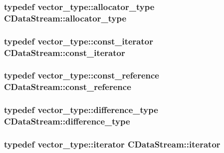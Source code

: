 \subsubsection[{allocator\+\_\+type}]{\setlength{\rightskip}{0pt plus 5cm}typedef vector\+\_\+type\+::allocator\+\_\+type {\bf C\+Data\+Stream\+::allocator\+\_\+type}}\label{class_c_data_stream_a297dff00e40bb161aab89fde868ee7b1}
\hypertarget{class_c_data_stream_abcfd79b72607505b22f18424e313b4c5}{}
\subsubsection[{const\+\_\+iterator}]{\setlength{\rightskip}{0pt plus 5cm}typedef vector\+\_\+type\+::const\+\_\+iterator {\bf C\+Data\+Stream\+::const\+\_\+iterator}}\label{class_c_data_stream_abcfd79b72607505b22f18424e313b4c5}
\hypertarget{class_c_data_stream_ada2ac4b4c962dd5a5dcccbc3f71e83ab}{}
\subsubsection[{const\+\_\+reference}]{\setlength{\rightskip}{0pt plus 5cm}typedef vector\+\_\+type\+::const\+\_\+reference {\bf C\+Data\+Stream\+::const\+\_\+reference}}\label{class_c_data_stream_ada2ac4b4c962dd5a5dcccbc3f71e83ab}
\hypertarget{class_c_data_stream_a9da973fb6e53a5335db78b6f8b90bdbf}{}
\subsubsection[{difference\+\_\+type}]{\setlength{\rightskip}{0pt plus 5cm}typedef vector\+\_\+type\+::difference\+\_\+type {\bf C\+Data\+Stream\+::difference\+\_\+type}}\label{class_c_data_stream_a9da973fb6e53a5335db78b6f8b90bdbf}
\hypertarget{class_c_data_stream_abed2013224bdf424e51c78bf483886d3}{}
\subsubsection[{iterator}]{\setlength{\rightskip}{0pt plus 5cm}typedef vector\+\_\+type\+::iterator {\bf C\+Data\+Stream\+::iterator}}\label{class_c_data_stream_abed2013224bdf424e51c78bf483886d3}
\hypertarget{class_c_data_stream_a33723921305add93b45973243faf1541}{}
